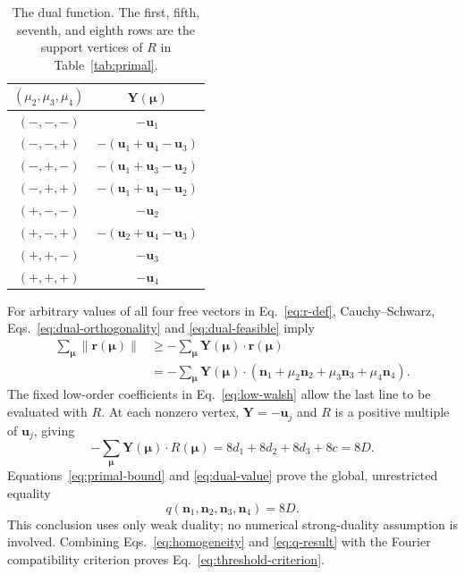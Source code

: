 \documentclass[aps,pra,reprint,superscriptaddress,nofootinbib,longbibliography]{revtex4-2}
\newcommand{\bmnu}{\bm{\mu}}
\newcommand{\bn}{\bm n}
\newcommand{\bu}{\bm u}
\begin{document}
\begin{table}[t]
 \caption{The dual function.  The first, fifth, seventh, and eighth rows are
 the support vertices of $R$ in Table~\ref{tab:primal}.}
 \label{tab:dual}
 \begin{ruledtabular}
 \begin{tabular}{cc}
 $(\mu_2,\mu_3,\mu_4)$ & $\bm Y(\bmnu)$ \\
 \hline
 $(-,-,-)$ & $-\bu_1$ \\
 $(-,-,+)$ & $-(\bu_1+\bu_4-\bu_3)$ \\
 $(-,+,-)$ & $-(\bu_1+\bu_3-\bu_2)$ \\
 $(-,+,+)$ & $-(\bu_1+\bu_4-\bu_2)$ \\
 $(+,-,-)$ & $-\bu_2$ \\
 $(+,-,+)$ & $-(\bu_2+\bu_4-\bu_3)$ \\
 $(+,+,-)$ & $-\bu_3$ \\
 $(+,+,+)$ & $-\bu_4$
 \end{tabular}
 \end{ruledtabular}
\end{table}

For arbitrary values of all four free vectors in Eq.~\eqref{eq:r-def},
Cauchy--Schwarz, Eqs.~\eqref{eq:dual-orthogonality} and
\eqref{eq:dual-feasible} imply
\begin{align}
 \sum_{\bmnu}\|\bm r(\bmnu)\|
 &\geq-\sum_{\bmnu}\bm Y(\bmnu)\mathbin{\cdot}\bm r(\bmnu)\nonumber\\
 &=-\sum_{\bmnu}\bm Y(\bmnu)\mathbin{\cdot}
 (\bn_1+\mu_2\bn_2+\mu_3\bn_3+\mu_4\bn_4).
 \label{eq:weak-duality}
\end{align}
The fixed low-order coefficients in Eq.~\eqref{eq:low-walsh} allow the last
line to be evaluated with $R$.  At each nonzero vertex,
$\bm Y=-\bu_j$ and $R$ is a positive multiple of $\bu_j$, giving
\begin{equation}
 -\sum_{\bmnu}\bm Y(\bmnu)\mathbin{\cdot}R(\bmnu)
 =8d_1+8d_2+8d_3+8c=8D.
 \label{eq:dual-value}
\end{equation}
Equations~\eqref{eq:primal-bound} and \eqref{eq:dual-value} prove the global,
unrestricted equality
\begin{equation}
 \boxed{q(\bn_1,\bn_2,\bn_3,\bn_4)=8D}.
 \label{eq:q-result}
\end{equation}
This conclusion uses only weak duality; no numerical strong-duality
assumption is involved.  Combining Eqs.~\eqref{eq:homogeneity} and
\eqref{eq:q-result} with the Fourier compatibility criterion proves
Eq.~\eqref{eq:threshold-criterion}.
\end{document}
